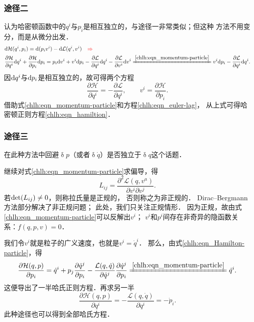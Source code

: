 \subsubsection{途径二}
认为哈密顿函数中的$q^i$与$p_i$是相互独立的，与途径一非常类似；但这种
方法不用变分，而是从微分出发． %
\begin{align*}
	&{\rm d} \mathcal{H}(q^i,p_i) = {\rm d} (p_i v^i) - {\rm d} \mathcal{L}(q^i,v^i)
        \quad {\color{red}\Rightarrow } \\
    & \frac{\partial \mathcal{H}}{\partial q^i } {\rm d} q^i
      +\frac{\partial \mathcal{H}}{\partial p_i } {\rm d} p_i =
      p_i {\rm d} v^i + v^i {\rm d} p_i
      -\frac{\partial \mathcal{L}}{\partial q^i } {\rm d} q^i
      -\frac{\partial \mathcal{L}}{\partial v^i } {\rm d} v^i
        \xlongequal{\ref{chlh:eqn_momentum-particle}}  
     v^i{\rm d} p_i -\frac{\partial \mathcal{L}}{\partial q^i } {\rm d} q^i.
\end{align*}
因${\rm d} q^i$与${\rm d}p_i$是相互独立的，故可得两个方程
\begin{equation}
    \frac{\partial \mathcal{H}}{\partial q^i } = -\frac{\partial \mathcal{L}}{\partial q^i }
    , \qquad v^i = \frac{\partial \mathcal{H}}{\partial p_i } .
\end{equation}
借助式\eqref{chlh:eqn_momentum-particle}和方程\eqref{chlh:eqn_euler-lag}，
从上式可得哈密顿正则方程\eqref{chlh:eqn_hamiltion}．


\subsubsection{途径三}
在此种方法中回避$\updelta p$（或者$\updelta \dot{q}$）是否独立于$\updelta q$这个话题．


继续对式\eqref{chlh:eqn_momentum-particle}求偏导，得
\begin{equation}\label{chlh:eqn_Hess}
    L_{ij} = \frac{\partial^2 \mathcal{L}(q,v^a)}{\partial v^i \partial v^j} .
\end{equation}
若${\rm det}(L_{ij}) \neq 0$，则称拉氏量是{\heiti 正规的}，
否则称之为{\heiti 非正规的}．
Dirac--Bergmann方法\cite{dirac-lecQ-1964}部分解决了非正规问题；
此处，我们只关注正规情形．
因为正规，故由式\eqref{chlh:eqn_momentum-particle}可以反解出$v^i$；
$v^i$和$p^i$间存在非奇异的隐函数关系：$f(q,p,v)=0$．


我们令$v^i$就是粒子的广义速度，也就是$v^i=\dot{q}^i$．
那么，由式\eqref{chlh:eqn_Hamilton-particle}，得
\begin{equation}
    \frac{\partial \mathcal{H}(q,p)}{\partial p_i} =
       \dot{q}^i + p_j \frac{\partial \dot{q}^j}{\partial p_i}
      - \frac{\mathcal{L}(q,\dot{q}) }{\partial \dot{q}^j} \frac{\partial \dot{q}^j}{\partial p_i}
      \xlongequal{\ref{chlh:eqn_momentum-particle}}
      \dot{q}^i .
\end{equation}
这便导出了一半哈氏正则方程．再求另一半
\begin{equation}
    \frac{\partial \mathcal{H}(q,p)}{\partial q^i} =
    - \frac{\mathcal{L}(q,\dot{q}) }{\partial {q}^i}
    =- \dot{p}_i .
\end{equation}
此种途径也可以得到全部哈氏方程． %

